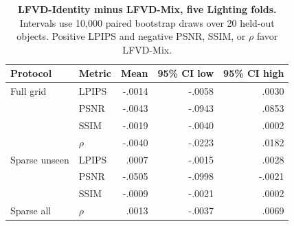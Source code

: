 \begin{table}[t]
\centering
\caption{\textbf{LFVD-Identity minus LFVD-Mix, five Lighting folds.}
Intervals use 10,000 paired bootstrap draws over 20 held-out objects. Positive
LPIPS and negative PSNR, SSIM, or $\rho$ favor LFVD-Mix.}
\label{tab:joint_concat_5fold_ci}
\scriptsize
\setlength{\tabcolsep}{3.1pt}
\begin{tabular}{llrrr}
\toprule
Protocol & Metric & Mean & 95\% CI low & 95\% CI high \\
\midrule
Full grid & LPIPS & -.0014 & -.0058 & .0030 \\
          & PSNR  & -.0043 & -.0943 & .0853 \\
          & SSIM  & -.0019 & -.0040 & .0002 \\
          & $\rho$ & -.0040 & -.0223 & .0182 \\
Sparse unseen & LPIPS & .0007 & -.0015 & .0028 \\
              & PSNR  & -.0505 & -.0998 & -.0021 \\
              & SSIM  & -.0009 & -.0021 & .0002 \\
Sparse all & $\rho$ & .0013 & -.0037 & .0069 \\
\bottomrule
\end{tabular}
\end{table}
